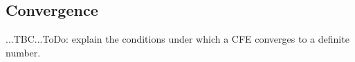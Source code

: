 


\subsection{Convergence} ...TBC...ToDo: explain the conditions under which a CFE converges to a definite number.






